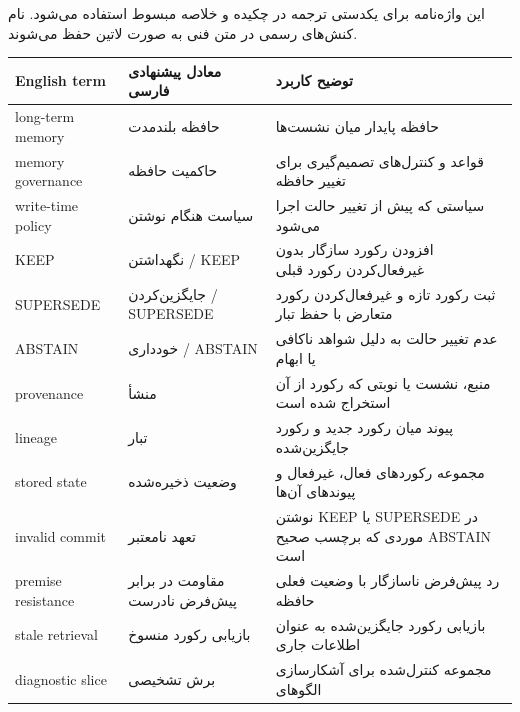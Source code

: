 این واژه‌نامه برای یکدستی ترجمه در چکیده و خلاصه مبسوط استفاده می‌شود. نام
کنش‌های رسمی در متن فنی به صورت لاتین حفظ می‌شوند.

{\def\LTcaptype{none} %
\begin{longtable}[]{@{}
  >{\raggedright\arraybackslash}p{}
  >{\raggedright\arraybackslash}p{}
  >{\raggedright\arraybackslash}p{}@{}}
\toprule\noalign{}
\begin{minipage}[b]{\linewidth}\raggedright
English term
\end{minipage} & \begin{minipage}[b]{\linewidth}\raggedright
معادل پیشنهادی فارسی
\end{minipage} & \begin{minipage}[b]{\linewidth}\raggedright
توضیح کاربرد
\end{minipage} \\
\midrule\noalign{}
\endhead
\bottomrule\noalign{}
\endlastfoot
long-term memory & حافظه بلندمدت & حافظه پایدار میان نشست‌ها \\
memory governance & حاکمیت حافظه & قواعد و کنترل‌های تصمیم‌گیری برای تغییر
حافظه \\
write-time policy & سیاست هنگام نوشتن & سیاستی که پیش از تغییر حالت اجرا
می‌شود \\
KEEP & نگهداشتن / KEEP & افزودن رکورد سازگار بدون غیرفعال‌کردن رکورد
قبلی \\
SUPERSEDE & جایگزین‌کردن / SUPERSEDE & ثبت رکورد تازه و غیرفعال‌کردن رکورد
متعارض با حفظ تبار \\
ABSTAIN & خودداری / ABSTAIN & عدم تغییر حالت به دلیل شواهد ناکافی یا
ابهام \\
provenance & منشأ & منبع، نشست یا نوبتی که رکورد از آن استخراج شده
است \\
lineage & تبار & پیوند میان رکورد جدید و رکورد جایگزین‌شده \\
stored state & وضعیت ذخیره‌شده & مجموعه رکوردهای فعال، غیرفعال و پیوندهای
آن‌ها \\
invalid commit & تعهد نامعتبر & نوشتن KEEP یا SUPERSEDE در موردی که
برچسب صحیح ABSTAIN است \\
premise resistance & مقاومت در برابر پیش‌فرض نادرست & رد پیش‌فرض ناسازگار
با وضعیت فعلی حافظه \\
stale retrieval & بازیابی رکورد منسوخ & بازیابی رکورد جایگزین‌شده به
عنوان اطلاعات جاری \\
diagnostic slice & برش تشخیصی & مجموعه کنترل‌شده برای آشکارسازی الگوهای

\end{longtable}}
